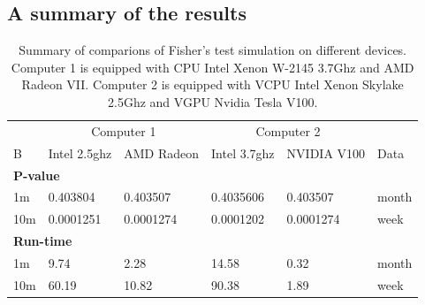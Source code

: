 \documentclass[article,nojss]{jss}\usepackage[]{graphicx}\usepackage[]{color}
\newenvironment{knitrout}{}{} %
\begin{document}
\subsection{A summary of the results}
\begin{knitrout}
\color{fgcolor}\begin{table}[H]

\caption{\label{tab:summarycompare}Summary of comparions of Fisher's test simulation on different devices. Computer 1 is equipped with CPU Intel Xenon W-2145 3.7Ghz and AMD Radeon VII. Computer 2 is equipped with	VCPU Intel Xenon Skylake 2.5Ghz and VGPU Nvidia Tesla V100.\label{tab:summary}}
\centering
\begin{tabular}[t]{l|l|l|l|l|l}
\hline
\multicolumn{1}{c|}{ } & \multicolumn{2}{c|}{Computer 1} & \multicolumn{2}{c|}{Computer 2} & \multicolumn{1}{c}{ } \\
\cline{2-3} \cline{4-5}
B & Intel 2.5ghz & AMD Radeon & Intel 3.7ghz & NVIDIA V100 & Data\\
\hline
\multicolumn{6}{l}{\textbf{P-value}}\\
\hline
\hspace{1em}1m & 0.403804 & 0.403507 & 0.4035606 & 0.403507 & month\\
\hline
\hspace{1em}10m & 0.0001251 & 0.0001274 & 0.0001202 & 0.0001274 & week\\
\hline
\multicolumn{6}{l}{\textbf{Run-time}}\\
\hline
\hspace{1em}1m & 9.74 & 2.28 & 14.58 & 0.32 & month\\
\hline
\hspace{1em}10m & 60.19 & 10.82 & 90.38 & 1.89 & week\\
\hline
\end{tabular}
\end{table}

\end{knitrout}
\end{document}

